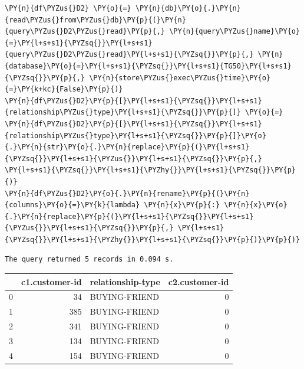     \begin{tcolorbox}[breakable, size=fbox, boxrule=1pt, pad at break*=1mm,colback=cellbackground, colframe=cellborder]
\begin{Verbatim}[commandchars=\\\{\}]
\PY{n}{df\PYZus{}D2} \PY{o}{=} \PY{n}{db}\PY{o}{.}\PY{n}{read\PYZus{}from\PYZus{}db}\PY{p}{(}\PY{n}{query\PYZus{}D2\PYZus{}read}\PY{p}{,} \PY{n}{query\PYZus{}name}\PY{o}{=}\PY{l+s+s1}{\PYZsq{}}\PY{l+s+s1}{query\PYZus{}D2\PYZus{}read}\PY{l+s+s1}{\PYZsq{}}\PY{p}{,} \PY{n}{database}\PY{o}{=}\PY{l+s+s1}{\PYZsq{}}\PY{l+s+s1}{TG50}\PY{l+s+s1}{\PYZsq{}}\PY{p}{,} \PY{n}{store\PYZus{}exec\PYZus{}time}\PY{o}{=}\PY{k+kc}{False}\PY{p}{)}
\PY{n}{df\PYZus{}D2}\PY{p}{[}\PY{l+s+s1}{\PYZsq{}}\PY{l+s+s1}{relationship\PYZus{}type}\PY{l+s+s1}{\PYZsq{}}\PY{p}{]} \PY{o}{=} \PY{n}{df\PYZus{}D2}\PY{p}{[}\PY{l+s+s1}{\PYZsq{}}\PY{l+s+s1}{relationship\PYZus{}type}\PY{l+s+s1}{\PYZsq{}}\PY{p}{]}\PY{o}{.}\PY{n}{str}\PY{o}{.}\PY{n}{replace}\PY{p}{(}\PY{l+s+s1}{\PYZsq{}}\PY{l+s+s1}{\PYZus{}}\PY{l+s+s1}{\PYZsq{}}\PY{p}{,} \PY{l+s+s1}{\PYZsq{}}\PY{l+s+s1}{\PYZhy{}}\PY{l+s+s1}{\PYZsq{}}\PY{p}{)}
\PY{n}{df\PYZus{}D2}\PY{o}{.}\PY{n}{rename}\PY{p}{(}\PY{n}{columns}\PY{o}{=}\PY{k}{lambda} \PY{n}{x}\PY{p}{:} \PY{n}{x}\PY{o}{.}\PY{n}{replace}\PY{p}{(}\PY{l+s+s1}{\PYZsq{}}\PY{l+s+s1}{\PYZus{}}\PY{l+s+s1}{\PYZsq{}}\PY{p}{,} \PY{l+s+s1}{\PYZsq{}}\PY{l+s+s1}{\PYZhy{}}\PY{l+s+s1}{\PYZsq{}}\PY{p}{)}\PY{p}{)}
\end{Verbatim}
\end{tcolorbox}

    \begin{Verbatim}[commandchars=\\\{\}]
The query returned 5 records in 0.094 s.
    \end{Verbatim}
 
            
    
    \begin{center}
\begin{tabular}{lrlr}
\toprule
 & c1.customer-id & relationship-type & c2.customer-id \\
\midrule
0 & 34 & BUYING-FRIEND & 0 \\
1 & 385 & BUYING-FRIEND & 0 \\
2 & 341 & BUYING-FRIEND & 0 \\
3 & 134 & BUYING-FRIEND & 0 \\
4 & 154 & BUYING-FRIEND & 0 \\
\bottomrule
\end{tabular}

\end{center}

